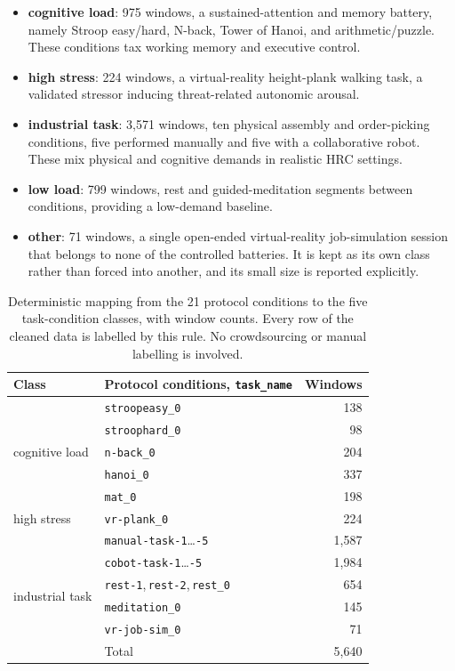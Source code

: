\documentclass{llncs}
\begin{document}
\begin{itemize}
\item \textbf{cognitive load}: 975 windows, a sustained-attention and memory battery,
namely Stroop easy/hard, N-back, Tower of Hanoi, and arithmetic/puzzle. These
conditions tax working memory and executive control.
\item \textbf{high stress}: 224 windows, a virtual-reality height-plank walking task,
a validated stressor inducing threat-related autonomic arousal.
\item \textbf{industrial task}: 3{,}571 windows, ten physical assembly and
order-picking conditions, five performed manually and five with a collaborative robot.
These mix physical and cognitive demands in realistic \ac{HRC} settings.
\item \textbf{low load}: 799 windows, rest and guided-meditation segments between
conditions, providing a low-demand baseline.
\item \textbf{other}: 71 windows, a single open-ended virtual-reality job-simulation
session that belongs to none of the controlled batteries. It is kept as its own class
rather than forced into another, and its small size is reported explicitly.
\end{itemize}

\begin{table}[t]
\centering
\small
\caption{Deterministic mapping from the 21 protocol conditions to the five
task-condition classes, with window counts. Every row of the cleaned data is labelled
by this rule. No crowdsourcing or manual labelling is involved.}
\label{tab:schema}
\begin{tabular}{@{}llr@{}}
\toprule
Class & Protocol conditions, \texttt{task\_name} & Windows \\
\midrule
\multirow{5}{*}{cognitive load} & \texttt{stroopeasy\_0} & 138 \\
 & \texttt{stroophard\_0} & 98 \\
 & \texttt{n-back\_0} & 204 \\
 & \texttt{hanoi\_0} & 337 \\
 & \texttt{mat\_0} & 198 \\
\multirow{1}{*}{high stress} & \texttt{vr-plank\_0} & 224 \\
\multirow{10}{*}{industrial task} & \texttt{manual-task-1}\dots\texttt{-5} & 1{,}587 \\
 & \texttt{cobot-task-1}\dots\texttt{-5} & 1{,}984 \\
\multirow{5}{*}{low load} & \texttt{rest-1},\,\texttt{rest-2},\,\texttt{rest\_0} & 654 \\
 & \texttt{meditation\_0} & 145 \\
\multirow{1}{*}{other} & \texttt{vr-job-sim\_0} & 71 \\
\midrule
 & Total & 5{,}640 \\
\bottomrule
\end{tabular}
\end{table}
\end{document}
